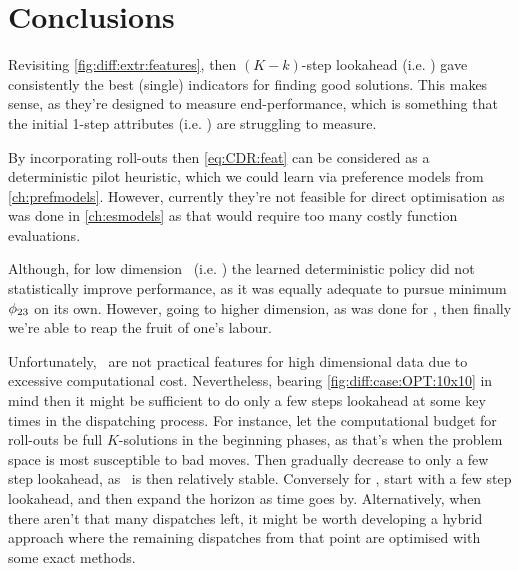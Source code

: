 \section{Conclusions}

Revisiting \cref{fig:diff:extr:features}, then $(K-k)$-step lookahead (i.e. 
\phiGlobalRelated) gave consistently the best (single) indicators for finding 
good solutions. 
This makes sense, as they're designed to measure end-performance, which is 
something that the initial 1-step attributes (i.e. \phiLocalRelated) are 
struggling to measure.

By incorporating roll-outs then \cref{eq:CDR:feat} can be considered as a 
deterministic pilot heuristic, which we could learn via preference models from 
\cref{ch:prefmodels}. However, currently they're not feasible for direct 
optimisation as was done in \cref{ch:esmodels} as that would require too many 
costly function evaluations.

Although, for low dimension \jsp\ (i.e. \Problem[6\times5]{\train}) the learned 
deterministic policy did not statistically improve performance, as it was 
equally adequate to pursue minimum $\phi_{23}$ on its own.
However, going to higher dimension, as was done for , then finally 
we're able to reap the fruit of one's labour.

Unfortunately, \phiRNDRelated\ are not practical features for high dimensional 
data due to excessive computational cost. 
Nevertheless, bearing \cref{fig:diff:case:OPT:10x10} in mind then it 
might be sufficient to do only a few steps lookahead at some key times in the 
dispatching process. For instance, let the computational budget for 
 roll-outs be full $K$-solutions in the beginning phases, as 
that's when the problem space is most susceptible to bad moves. Then gradually 
decrease to only a few step lookahead, as \fsp\ is then relatively stable.
Conversely for , start with a few step lookahead, and then 
expand the horizon as time goes by. Alternatively, when there aren't that many 
dispatches left, it might be worth developing a hybrid approach where the 
remaining dispatches from that point are optimised with some exact methods. 
